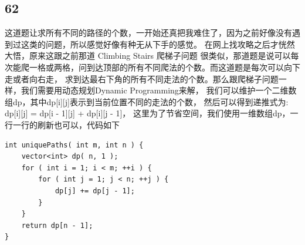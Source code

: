 \documentclass[12pt,a4paper]{article}
\begin{document}
\subsection{62}
\begin{CJK}{UTF8}{gbsn}
这道题让求所有不同的路径的个数，一开始还真把我难住了，因为之前好像没有遇到过这类的问题，所以感觉好像有种无从下手的感觉。
在网上找攻略之后才恍然大悟，原来这跟之前那道 Climbing Stairs 爬梯子问题 很类似，那道题是说可以每次能爬一格或两格，问到达顶部的所有不同爬法的个数。而这道题是每次可以向下走或者向右走，
求到达最右下角的所有不同走法的个数。那么跟爬梯子问题一样，我们需要用动态规划Dynamic Programming来解，
我们可以维护一个二维数组dp，其中dp[i][j]表示到当前位置不同的走法的个数，
然后可以得到递推式为: dp[i][j] = dp[i - 1][j] + dp[i][j - 1]，
这里为了节省空间，我们使用一维数组dp，一行一行的刷新也可以，代码如下
\end{CJK}
\begin{lstlisting}
int uniquePaths( int m, int n ) {
	vector<int> dp( n, 1 );
	for ( int i = 1; i < m; ++i ) {
		for ( int j = 1; j < n; ++j ) {
			dp[j] += dp[j - 1];
		}
	}
	return dp[n - 1];
}
\end{lstlisting}
\end{document}

